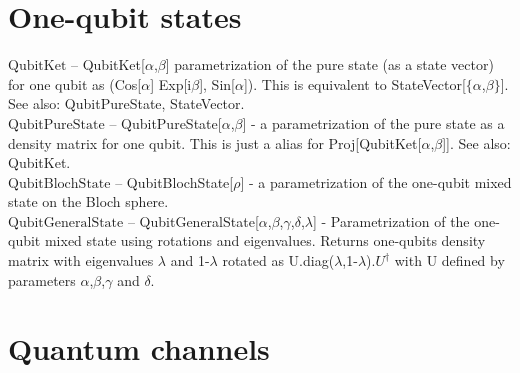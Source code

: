 \documentclass[a4paper,10pt]{scrartcl}
\begin{document}
\section{One-qubit states}

\noindent\textbf{$ \text{QubitKet} $ }-- QubitKet[$\alpha $,$\beta $] parametrization of the pure state (as a state vector) for one qubit as (Cos[$\alpha $] Exp[i$\beta $], Sin[$\alpha $]). This is equivalent to StateVector[$\{\alpha $,$\beta \}$]. See also: QubitPureState, StateVector.$  $\\[8pt]
\noindent\textbf{$ \text{QubitPureState} $ }-- QubitPureState[$\alpha $,$\beta $] - a parametrization of the pure state as a density matrix for one qubit. This is just a alias for Proj[QubitKet[$\alpha $,$\beta $]]. See also: QubitKet.$  $\\[8pt]
\noindent\textbf{$ \text{QubitBlochState} $ }-- QubitBlochState[$\rho $] - a parametrization of the one-qubit mixed state on the Bloch sphere.$  $\\[8pt]
\noindent\textbf{$ \text{QubitGeneralState} $ }-- QubitGeneralState[$\alpha $,$\beta $,$\gamma $,$\delta $,$\lambda $] - Parametrization of the one-qubit mixed state using rotations and eigenvalues. Returns one-qubits density matrix with eigenvalues $\lambda $ and 1-$\lambda $ rotated as U.diag($\lambda $,1-$\lambda $).$ U^{\dagger } $ with U defined by parameters $\alpha $,$\beta $,$\gamma $ and $\delta $.$  $\\[8pt]
\section{Quantum channels}
\end{document}
